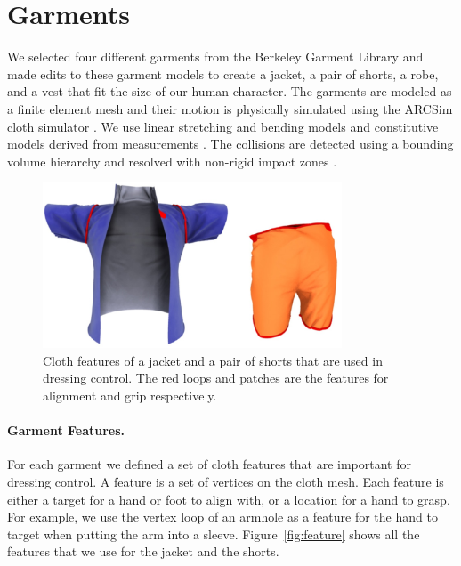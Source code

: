 \section{Garments}

We selected four different garments from the Berkeley Garment Library and made
edits to these garment models to create a jacket, a pair of
shorts, a robe, and a vest that fit the size of our human character. The
garments are modeled as a finite element mesh and their motion is
physically simulated
using the ARCSim cloth simulator \cite{Narain:2012:AAR}. We use linear
stretching and bending models and constitutive models derived from
measurements \cite{Wang:2011}. The collisions are detected using a
bounding volume hierarchy \cite{Tang:2010} and resolved with non-rigid
impact zones \cite{Harmon:2008}.

\begin{figure}[!t]
  \centering
  \includegraphics[width=3.5in]{images/features}
  \caption{Cloth features of a jacket and a pair of shorts that are used in dressing control. The red loops and patches are the features for alignment and grip respectively.}
  \label{fig:features}
\end{figure}


\paragraph{Garment Features.} For each garment we defined a set of cloth
features that are important for dressing control. A feature is a set of
vertices on the cloth mesh.  Each feature is either a target for a hand or
foot to align with, or a location for a hand to grasp.  For example, we
use the vertex loop of an armhole as a feature for the hand to target when
putting the arm into a sleeve.  Figure~\ref{fig:feature} shows all the
features that we use for the jacket and the shorts.
